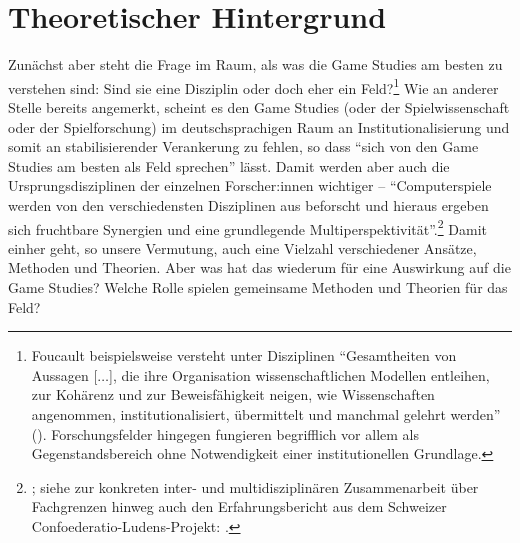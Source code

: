 \documentclass{scrartcl}
\begin{document}
\section{Theoretischer Hintergrund}\label{sec:hintergrund}
Zunächst aber steht die Frage im Raum, als was die Game Studies am besten zu verstehen sind:
Sind sie eine Disziplin oder doch eher ein Feld?\footnote{Foucault beispielsweise versteht unter Disziplinen \enquote{Gesamtheiten von Aussagen [$\ldots$], die ihre Organisation wissenschaftlichen Modellen entleihen, zur Kohärenz und zur Beweisfähigkeit neigen, wie Wissenschaften angenommen, institutionalisiert, übermittelt und manchmal gelehrt werden} (\autocite[][S.~253--254]{foucault_archaologie_2011}). Forschungsfelder hingegen fungieren begrifflich vor allem als Gegenstandsbereich ohne Notwendigkeit einer institutionellen Grundlage.}
Wie an anderer Stelle bereits angemerkt, scheint es den Game Studies (oder der Spielwissenschaft oder der Spielforschung) im deutschsprachigen Raum an Institutionalisierung und somit an stabilisierender Verankerung zu fehlen,\autocite[Vgl.][S.~26]{unterhuber_wer_2024} so dass \enquote{sich von den Game Studies am besten als Feld sprechen} lässt.\autocite[][S.~26]{unterhuber_wer_2024}
Damit werden aber auch die Ursprungsdisziplinen der einzelnen Forscher:innen wichtiger -- \enquote{Computerspiele werden von den verschiedensten Disziplinen aus beforscht und hieraus ergeben sich fruchtbare Synergien und eine grundlegende Multiperspektivität}.\footnote{\autocite[][S.~26]{unterhuber_wer_2024}; siehe zur konkreten inter- und multidisziplinären Zusammenarbeit über Fachgrenzen hinweg auch den Erfahrungsbericht aus dem Schweizer Confoederatio-Ludens-Projekt: \autocite{bemelmans_bridging_2024}.}
Damit einher geht, so unsere Vermutung, auch eine Vielzahl verschiedener Ansätze, Methoden und Theorien.
Aber was hat das wiederum für eine Auswirkung auf die Game Studies?
Welche Rolle spielen gemeinsame Methoden und Theorien für das Feld?
\end{document}
